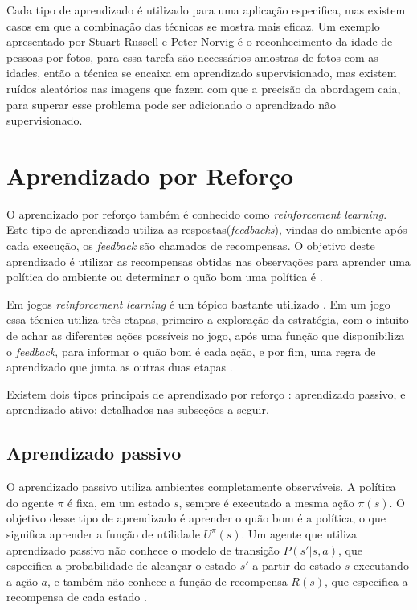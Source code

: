 Cada tipo de aprendizado é utilizado para uma aplicação especifica, mas existem casos em que a combinação das técnicas se mostra mais eficaz. 
Um exemplo apresentado por Stuart Russell e Peter Norvig\cite{intelligence2003modern} é o reconhecimento da idade de pessoas por fotos, para essa tarefa são necessários amostras de fotos com as idades, então a técnica se encaixa em aprendizado supervisionado, mas existem ruídos aleatórios nas imagens que fazem com que a precisão da abordagem caia, para superar esse problema pode ser adicionado o aprendizado não supervisionado.

\section{Aprendizado por Reforço}

O aprendizado por reforço também é conhecido como \textit{reinforcement learning}. Este tipo de aprendizado utiliza as respostas(\textit{feedbacks}), vindas do ambiente após cada execução, os \textit{feedback} são chamados de recompensas. O objetivo deste aprendizado é utilizar as recompensas obtidas nas observações para aprender uma política do ambiente ou determinar o quão bom uma política é \cite{intelligence2003modern}. 

Em jogos \textit{reinforcement learning} é um tópico bastante utilizado \cite{millington2009artificial}. Em um jogo essa técnica utiliza três etapas, primeiro a exploração da estratégia, com o intuito de achar as diferentes ações possíveis no jogo, após uma função que disponibiliza o \textit{feedback}, para informar o quão bom é cada ação, e por fim, uma regra de aprendizado que junta as outras duas etapas \cite{millington2009artificial}.

Existem dois tipos principais de aprendizado por reforço \cite{intelligence2003modern}: aprendizado passivo, e aprendizado ativo; detalhados nas subseções a seguir. 

\subsection{Aprendizado passivo} 

O aprendizado passivo utiliza ambientes completamente observáveis. A política do agente $\pi$ é fixa, em um estado $s$, sempre é executado a mesma ação $\pi(s)$. O objetivo desse tipo de aprendizado é aprender o quão bom é a política, o que significa aprender a função de utilidade $U^{\pi}(s)$. Um agente que utiliza aprendizado passivo não conhece o modelo de transição $P(s' | s, a)$, que especifica a probabilidade de alcançar o estado $s'$ a partir do estado $s$ executando a ação $a$, e também não conhece a função de recompensa $R(s)$, que especifica a recompensa de cada estado \cite{intelligence2003modern}. 

